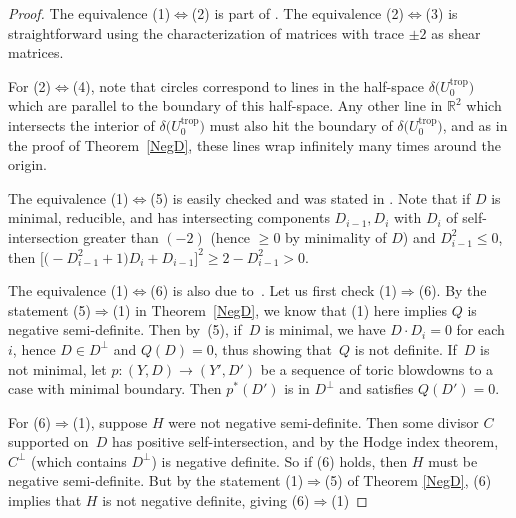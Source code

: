 \documentclass[11pt]{article}
\numberwithin{equation}{section}
\numberwithin{figure}{section}
\numberwithin{table}{section}
\DeclareMathOperator{\trop}{trop}
\let\bb=\mathbb
\let\rar=\rightarrow
\theoremstyle{definition}
\begin{document}
\begin{proof}
The equivalence (1)$\Leftrightarrow$(2) is part of \cite[Lemma 1.5, arXiv v1]{GHK1}. The equivalence (2)$\Leftrightarrow$(3) is straightforward using the characterization of matrices with trace $\pm 2$ as shear matrices.

For (2)$\Leftrightarrow$(4), note that circles correspond to lines in the half-space $\delta\big(U_0^{\trop}\big)$ which are parallel to the boundary of this half-space. Any other line in $\bb{R}^2$ which intersects the interior of $\delta\big(U_0^{\trop}\big)$ must also hit the boundary of $\delta\big(U_0^{\trop}\big)$, and as in the proof of Theorem~\ref{NegD}, these lines wrap infinitely many times around the origin.

The equivalence (1)$\Leftrightarrow$(5) is easily checked and was stated in \cite[Section~0.5.2, arXiv v1]{GHK1}. Note that if $D$ is minimal, reducible, and has intersecting components $D_{i-1}, D_i$ with $D_i$ of self-inter\-section greater than $(-2)$ (hence $\geq 0$ by minimality of $D$) and $D_{i-1}^2\leq 0$, then $\big[\big({-}D_{i-1}^2+1\big)D_i+D_{i-1}\big]^2\geq 2-D_{i-1}^2 > 0$.

The equivalence (1)$\Leftrightarrow$(6) is also due to~\cite{GHK2}. Let us first check (1)$\Rightarrow$(6). By the statement (5)$\Rightarrow$(1) in Theorem~\ref{NegD}, we know that (1) here implies $Q$ is negative semi-definite. Then by~(5), if~$D$ is minimal, we have $D\cdot D_i=0$ for each $i$, hence $D\in D^{\perp}$ and $Q(D)=0$, thus showing that~$Q$ is not definite. If~$D$ is not minimal, let $p\colon (Y,D)\rar (Y',D')$ be a sequence of toric blowdowns to a case with minimal boundary. Then $p^*(D')$ is in $D^{\perp}$ and satisfies $Q(D')=0$.

For (6)$\Rightarrow$(1), suppose $H$ were not negative semi-definite. Then some divisor $C$ supported on~$D$ has positive self-intersection, and by the Hodge index theorem, $C^{\perp}$ (which contains $D^{\perp}$) is negative definite. So if (6) holds, then $H$ must be negative semi-definite. But by the statement (1)$\Rightarrow$(5) of Theorem \ref{NegD}, (6) implies that $H$ is not negative definite, giving (6)$\Rightarrow$(1)


\end{proof}
\end{document}

